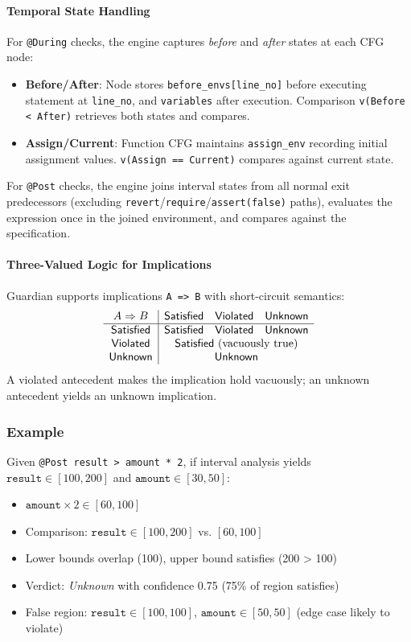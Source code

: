 \documentclass[pdflatex,sn-basic]{sn-jnl}%
\theoremstyle{thmstyleone}%
\theoremstyle{thmstyletwo}%
\theoremstyle{thmstylethree}%
\begin{document}
\paragraph{Temporal State Handling}
For \texttt{@During} checks, the engine captures \textit{before} and \textit{after} states at each CFG node:
\begin{itemize}
    \item \textbf{Before/After}: Node stores \texttt{before\_envs[line\_no]} before executing statement at \texttt{line\_no}, and \texttt{variables} after execution. Comparison \texttt{v(Before < After)} retrieves both states and compares.
    \item \textbf{Assign/Current}: Function CFG maintains \texttt{assign\_env} recording initial assignment values. \texttt{v(Assign == Current)} compares against current state.
\end{itemize}

For \texttt{@Post} checks, the engine joins interval states from all normal exit predecessors (excluding \texttt{revert}/\texttt{require}/\texttt{assert(false)} paths), evaluates the expression once in the joined environment, and compares against the specification.

\paragraph{Three-Valued Logic for Implications}
Guardian supports implications \texttt{A => B} with short-circuit semantics:
\[
\begin{array}{c|ccc}
A \Rightarrow B & \textsf{Satisfied} & \textsf{Violated} & \textsf{Unknown} \\\hline
\textsf{Satisfied}      & \textsf{Satisfied} & \textsf{Violated} & \textsf{Unknown}\\
\textsf{Violated}      & \multicolumn{3}{c}{\textsf{Satisfied} \text{ (vacuously true)}} \\
\textsf{Unknown}      & \multicolumn{3}{c}{\textsf{Unknown}}
\end{array}
\]
A violated antecedent makes the implication hold vacuously; an unknown antecedent yields an unknown implication.

\subsubsection{Example}
Given \texttt{@Post result > amount * 2}, if interval analysis yields $\texttt{result} \in [100, 200]$ and $\texttt{amount} \in [30, 50]$:
\begin{itemize}
    \item $\texttt{amount} \times 2 \in [60, 100]$
    \item Comparison: $\texttt{result} \in [100, 200]$ vs. $[60, 100]$
    \item Lower bounds overlap (100), upper bound satisfies (200 > 100)
    \item Verdict: \textit{Unknown} with confidence 0.75 (75\% of region satisfies)
    \item False region: $\texttt{result} \in [100, 100]$, $\texttt{amount} \in [50, 50]$ (edge case likely to violate)
\end{itemize}
\end{document}
